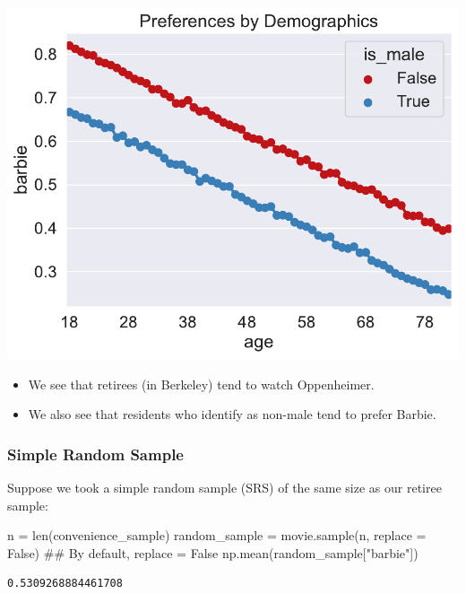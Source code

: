 \documentclass[
  letterpaper,
  DIV=11,
  numbers=noendperiod]{scrreprt}
\newenvironment{Shaded}{\begin{snugshade}}{\end{snugshade}}
\newcommand{\BuiltInTok}[1]{\textcolor[rgb]{0.00,0.23,0.31}{#1}}
\newcommand{\CommentTok}[1]{\textcolor[rgb]{0.37,0.37,0.37}{#1}}
\newcommand{\NormalTok}[1]{\textcolor[rgb]{0.00,0.23,0.31}{#1}}
\newcommand{\OperatorTok}[1]{\textcolor[rgb]{0.37,0.37,0.37}{#1}}
\newcommand{\StringTok}[1]{\textcolor[rgb]{0.13,0.47,0.30}{#1}}
\newcommand{\VariableTok}[1]{\textcolor[rgb]{0.07,0.07,0.07}{#1}}
\providecommand{\tightlist}{%
  \setlength{\itemsep}{0pt}\setlength{\parskip}{0pt}}\usepackage{longtable,booktabs,array}
\begin{document}
\includegraphics{sampling/sampling_files/figure-pdf/cell-9-output-1.pdf}

\begin{itemize}
\tightlist
\item
  We see that retirees (in Berkeley) tend to watch Oppenheimer.
\item
  We also see that residents who identify as non-male tend to prefer
  Barbie.
\end{itemize}

\subsubsection{Simple Random Sample}\label{simple-random-sample}

Suppose we took a simple random sample (SRS) of the same size as our
retiree sample:

\begin{Shaded}
\begin{Highlighting}[]
\NormalTok{n }\OperatorTok{=} \BuiltInTok{len}\NormalTok{(convenience\_sample)}
\NormalTok{random\_sample }\OperatorTok{=}\NormalTok{ movie.sample(n, replace }\OperatorTok{=} \VariableTok{False}\NormalTok{) }\CommentTok{\#\# By default, replace = False}
\NormalTok{np.mean(random\_sample[}\StringTok{"barbie"}\NormalTok{])}
\end{Highlighting}
\end{Shaded}

\begin{verbatim}
0.5309268884461708
\end{verbatim}
\end{document}
